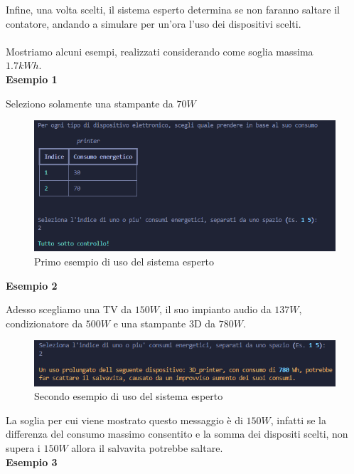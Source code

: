 \documentclass[12pt, letterpaper]{article}
\begin{document}
\noindent Infine, una volta scelti, il sistema esperto determina se non faranno saltare il
contatore, andando a simulare per un'ora l'uso dei dispositivi scelti. \\ \\
Mostriamo alcuni esempi, realizzati considerando come soglia massima \\ $1.7kWh$. \\

\noindent \textbf{Esempio 1}

\noindent Seleziono solamente una stampante da $70W$

\begin{figure}[h]
      \centering
      \includegraphics[scale=0.70]{sistema-esperto-esempio-1.png}
      \caption{Primo esempio di uso del sistema esperto}
\end{figure}

\noindent \textbf{Esempio 2}

\noindent Adesso scegliamo una TV da $150W$, il suo impianto audio da $137W$, condizionatore da $500W$ e una
stampante 3D da $780W$.

\begin{figure}[h]
      \centering
      \includegraphics[scale=0.70]{sistema-esperto-esempio-2.png}
      \caption{Secondo esempio di uso del sistema esperto}
\end{figure}

\noindent La soglia per cui viene mostrato questo messaggio è di $150W$, infatti se la differenza del
consumo massimo consentito e la somma dei dispositi scelti, non supera i $150W$ allora il salvavita potrebbe
saltare. \\

\noindent \textbf{Esempio 3}
\end{document}
